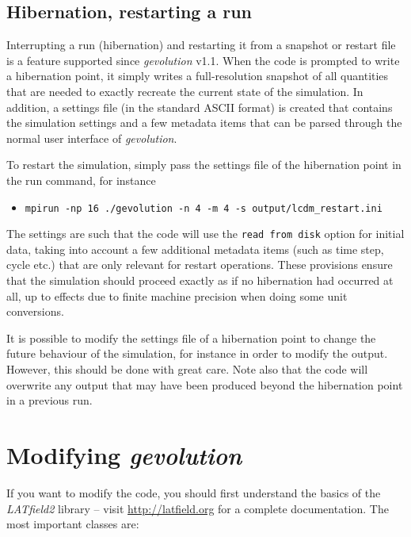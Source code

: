 \documentclass[a4paper,10pt]{article}
\begin{document}
\subsection{Hibernation, restarting a run}

Interrupting a run (hibernation) and restarting it from a snapshot or restart file is a feature supported since
\textit{gevolution} v1.1. When the code is prompted to write a hibernation point, it simply writes a full-resolution snapshot
of all quantities that are needed to exactly recreate the current state of the simulation. In addition, a settings file (in the
standard ASCII format) is created that contains the simulation settings and a few metadata items that can be parsed through the
normal user interface of \textit{gevolution}.

To restart the simulation, simply pass the settings file of the hibernation point in the run command, for instance

\begin{itemize}
 \item[] \texttt{mpirun -np 16 ./gevolution -n 4 -m 4 -s output/lcdm\_restart.ini} 
\end{itemize}

The settings are such that the code will use the \texttt{read from disk} option for initial data, taking into account a few
additional metadata items (such as time step, cycle etc.) that are only relevant for restart operations. These provisions
ensure that the simulation should proceed exactly as if no hibernation had occurred at all, up to effects due to finite machine
precision when doing some unit conversions.

It is possible to modify the settings file of a hibernation point to change the future behaviour of the simulation, for instance in order
to modify the output. However, this should be done with great care. Note also that the code will overwrite any output that may have
been produced beyond the hibernation point in a previous run.

\section{Modifying \textit{gevolution}}

If you want to modify the code, you should first understand the basics of the \textit{LATfield2} library -- visit \url{http://latfield.org} for a complete documentation. The most important classes are:
\end{document}
